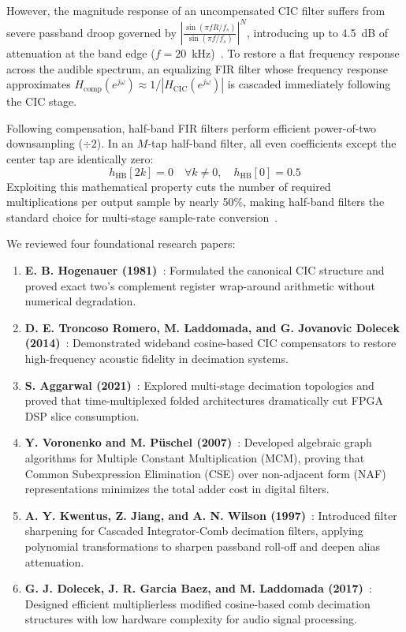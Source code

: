 \documentclass[11pt,a4paper]{article}
\begin{document}
However, the magnitude response of an uncompensated CIC filter suffers from severe passband droop governed by $\left|\frac{\sin(\pi f R / f_s)}{\sin(\pi f / f_s)}\right|^N$, introducing up to 4.5~dB of attenuation at the band edge ($f = 20$~kHz)~\cite{dolecek2009}. To restore a flat frequency response across the audible spectrum, an equalizing FIR filter whose frequency response approximates $H_{\text{comp}}(e^{j\omega}) \approx 1 / |H_{\text{CIC}}(e^{j\omega})|$ is cascaded immediately following the CIC stage.

Following compensation, half-band FIR filters perform efficient power-of-two downsampling ($\div 2$). In an $M$-tap half-band filter, all even coefficients except the center tap are identically zero:
\begin{equation}
  h_{\text{HB}}[2k] = 0 \quad \forall k \ne 0, \quad h_{\text{HB}}[0] = 0.5
  \label{eq:halfband}
\end{equation}
Exploiting this mathematical property cuts the number of required multiplications per output sample by nearly 50\%, making half-band filters the standard choice for multi-stage sample-rate conversion~\cite{aggarwal2021}.

We reviewed four foundational research papers:
\begin{enumerate}
  \item \textbf{E. B. Hogenauer (1981)}~\cite{hogenauer1981}: Formulated the canonical CIC structure and proved exact two's complement register wrap-around arithmetic without numerical degradation.
  \item \textbf{D. E. Troncoso Romero, M. Laddomada, and G. Jovanovic Dolecek (2014)}~\cite{troncoso2014}: Demonstrated wideband cosine-based CIC compensators to restore high-frequency acoustic fidelity in decimation systems.
  \item \textbf{S. Aggarwal (2021)}~\cite{aggarwal2021}: Explored multi-stage decimation topologies and proved that time-multiplexed folded architectures dramatically cut FPGA DSP slice consumption.
  \item \textbf{Y. Voronenko and M. P\"uschel (2007)}~\cite{voronenko2007}: Developed algebraic graph algorithms for Multiple Constant Multiplication (MCM), proving that Common Subexpression Elimination (CSE) over non-adjacent form (NAF) representations minimizes the total adder cost in digital filters.
  \item \textbf{A. Y. Kwentus, Z. Jiang, and A. N. Wilson (1997)}~\cite{kwentus1997}: Introduced filter sharpening for Cascaded Integrator-Comb decimation filters, applying polynomial transformations to sharpen passband roll-off and deepen alias attenuation.
  \item \textbf{G. J. Dolecek, J. R. Garcia Baez, and M. Laddomada (2017)}~\cite{dolecek2017}: Designed efficient multiplierless modified cosine-based comb decimation structures with low hardware complexity for audio signal processing.
\end{enumerate}
\end{document}
